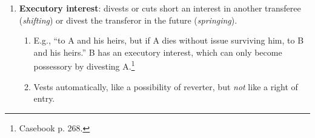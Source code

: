 \begin{enumerate}
\begin{enumerate}
\begin{enumerate}
            estate~.~.~.''\footnote{Casebook p. 258.}
            \begin{enumerate}
                \item \emph{Indefeasibly vested}: cannot be divested. E.g., 
                ``to A for life, then to B and her heirs.'' B has an 
                indefeasibly vested remainder.
                \item \emph{Subject to divestment}: vested, but can be 
                divested if an event happens. E.g., ``to A for life, then to B 
                and her heirs, but if B does not survive A, to C and his 
                heirs.''\footnote{Casebook p. 261 example 8.} B has a vested 
                remainder subject to divestment.
                \item \emph{Vested subject to open} (or \emph{subject to 
                partial divestment}): later-born children can share in the 
                gift. E.g., ``to A for life, then to A's children and their 
                heirs.'' At the time of the conveyance, A has one child, B. B 
                has a vested remainder subject to open because A could have 
                more children before she dies.
            \end{enumerate}
            \item \textbf{Contingent}: (1) given to an unascertained person or 
            (2) contingent upon an event other than the natural termination of 
            the preceding estates. E.g., ``to A for life, then to the heirs of 
            B.'' The remainder is contingent because the heirs of B cannot be 
            ascertained until B dies.\footnote{Casebook p. 260 example 5.}
        \end{enumerate}
        \item \textbf{Executory interest}: divests or cuts short an interest 
        in another transferee (\emph{shifting}) or divest the transferor in 
        the future (\emph{springing}).
        \begin{enumerate}
            \item E.g., ``to A and his heirs, but if A dies without issue 
            surviving him, to B and his heirs.'' B has an executory interest, 
            which can only become possessory by divesting A.\footnote{Casebook 
            p. 268.}
            \item Vests automatically, like a possibility of reverter, but 
            \emph{not} like a right of entry.
        \end{enumerate}

\end{enumerate}
\end{enumerate}
